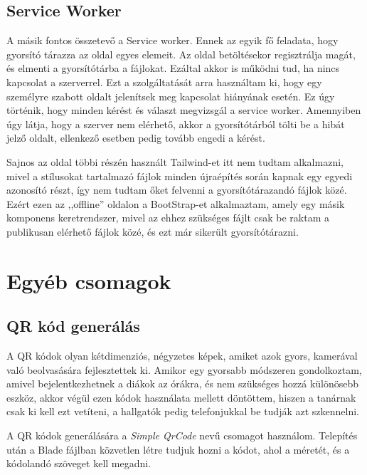 \documentclass[
]{thesis-ekf}
\theoremstyle{definition}
\theoremstyle{remark}
\begin{document}
\subsection{Service Worker}

A másik fontos összetevő a Service worker. Ennek az egyik fő feladata, hogy gyorsító tárazza az oldal egyes elemeit. Az oldal betöltésekor regisztrálja magát, és elmenti a gyorsítótárba a fájlokat. Ezáltal akkor is működni tud, ha nincs kapcsolat a szerverrel. Ezt a szolgáltatását arra használtam ki, hogy egy személyre szabott oldalt jelenítsek meg kapcsolat hiányának esetén. Ez úgy történik, hogy minden kérést és választ megvizsgál a service worker. Amennyiben úgy látja, hogy a szerver nem elérhető, akkor a gyorsítótárból tölti be a hibát jelző oldalt, ellenkező esetben pedig tovább engedi a kérést. 

Sajnos az oldal többi részén használt Tailwind-et itt nem tudtam alkalmazni, mivel a stílusokat tartalmazó fájlok minden újraépítés során kapnak egy egyedi azonosító részt, így nem tudtam őket felvenni a gyorsítótárazandó fájlok közé. Ezért ezen az ,,offline'' oldalon a BootStrap-et\cite{bootstrap} alkalmaztam, amely egy másik komponens keretrendszer, mivel az ehhez szükséges fájlt csak be raktam a publikusan elérhető fájlok közé, és ezt már sikerült gyorsítótárazni.



\section{Egyéb csomagok}

\subsection{QR kód generálás}

A QR kódok olyan kétdimenziós, négyzetes képek, amiket azok gyors, kamerával való beolvasására fejlesztettek ki.\cite{qrCodeWhatIsIt} Amikor egy gyorsabb módszeren gondolkoztam, amivel bejelentkezhetnek a diákok az órákra, és nem szükséges hozzá különösebb eszköz, akkor végül ezen kódok használata mellett döntöttem, hiszen a tanárnak csak ki kell ezt vetíteni, a hallgatók pedig telefonjukkal be tudják azt szkennelni.

A QR kódok generálására a \emph{Simple QrCode}\cite{qrCode} nevű csomagot használom. Telepítés után a Blade fájlban közvetlen létre tudjuk hozni a kódot, ahol a méretét, és a kódolandó szöveget kell megadni.
\end{document}
